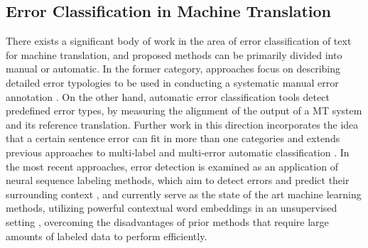 \subsection{Error Classification in Machine Translation}
\label{ssec:related_errors}

There exists a significant body of work in the area of error classification of text for machine translation, and proposed methods can be primarily divided into manual or automatic. In the former category, approaches focus on describing detailed error typologies to be used in conducting a systematic manual error annotation \cite{fishel2011automatic,vilar2006error, lommel2014multidimensional, farrus2010linguistic, costa2015linguistically}. On the other hand,  automatic error classification tools \cite{zeman2011addicter, popovic2011hjerson,popovic2015poor} detect predefined error types, by measuring the alignment of the output of a MT system and its reference translation. Further work in this direction incorporates the idea that a certain sentence error can fit in more than one categories \cite{klubivcka2018quantitative, lommel2014assessing} and extends previous approaches to multi-label and multi-error automatic classification \citet{popovic2019automatic}. In the most recent approaches, error detection is examined as an application of neural sequence labeling methods, which aim to detect errors and predict their surrounding context \cite{rei2017semi}, and currently serve as the state of the art machine learning methods, utilizing powerful contextual word embeddings in an unsupervised setting \cite{bell2019context}, overcoming the disadvantages of prior methods that require large amounts of labeled data to perform efficiently.